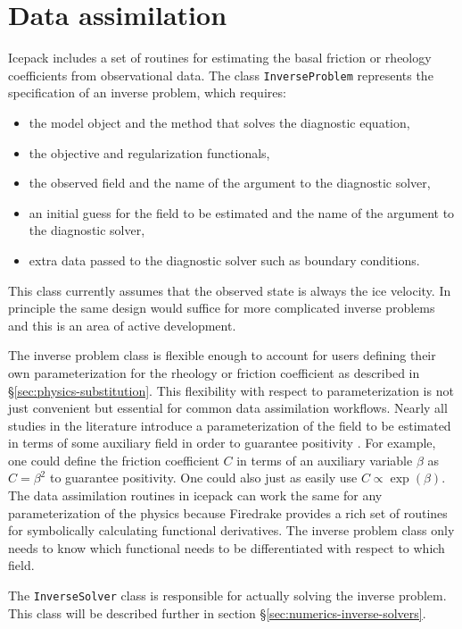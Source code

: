 \documentclass{article}
\theoremstyle{definition}
\theoremstyle{plain}
\begin{document}
\section{Data assimilation} \label{sec:data-assimilation}

Icepack includes a set of routines for estimating the basal friction or rheology coefficients from observational data.
The class \texttt{InverseProblem} represents the specification of an inverse problem, which requires:
\begin{itemize}
    \item the model object and the method that solves the diagnostic equation,
    \item the objective and regularization functionals,
    \item the observed field and the name of the argument to the diagnostic solver,
    \item an initial guess for the field to be estimated and the name of the argument to the diagnostic solver,
    \item extra data passed to the diagnostic solver such as boundary conditions.
\end{itemize}
This class currently assumes that the observed state is always the ice velocity.
In principle the same design would suffice for more complicated inverse problems and this is an area of active development.

The inverse problem class is flexible enough to account for users defining their own parameterization for the rheology or friction coefficient as described in \S\ref{sec:physics-substitution}.
This flexibility with respect to parameterization is not just convenient but essential for common data assimilation workflows.
Nearly all studies in the literature introduce a parameterization of the field to be estimated in terms of some auxiliary field in order to guarantee positivity \citep{macayeal1992basal, joughin2009basal}.
For example, one could define the friction coefficient $C$ in terms of an auxiliary variable $\beta$ as $C = \beta^2$ to guarantee positivity.
One could also just as easily use $C \propto \exp(\beta)$.
The data assimilation routines in icepack can work the same for any parameterization of the physics because Firedrake provides a rich set of routines for symbolically calculating functional derivatives.
The inverse problem class only needs to know which functional needs to be differentiated with respect to which field.

The \texttt{InverseSolver} class is responsible for actually solving the inverse problem.
This class will be described further in section \S\ref{sec:numerics-inverse-solvers}.
\end{document}

